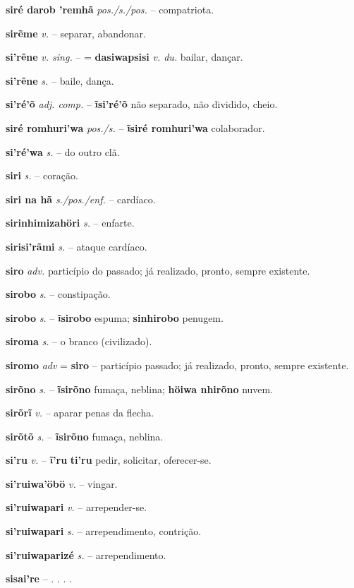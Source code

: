 \textbf{siré darob 'remhã} \textit{pos./s./pos.} -- compatriota.

\textbf{sirẽme} \textit{v.} -- separar, abandonar.

\textbf{si'rẽne} \textit{v. sing.} -- = \textbf{dasiwapsisi} \textit{v. du.} bailar, dançar.

\textbf{si'rẽne} \textit{s.} -- baile, dança.

\textbf{si'ré'õ} \textit{adj. comp.} -- \textbf{ĩsi'ré'õ} não separado, não dividido, cheio.

\textbf{siré romhuri'wa} \textit{pos./s.} -- \textbf{ĩsiré romhuri'wa} colaborador.

\textbf{si'ré'wa} \textit{s.} -- do outro clã.

\textbf{siri} \textit{s.} -- coração.

\textbf{siri na hã} \textit{s./pos./enf.} -- cardíaco.

\textbf{sirinhimizahöri} \textit{s.} -- enfarte.

\textbf{sirisi'rãmi} \textit{s.} -- ataque cardíaco.

\textbf{siro} \textit{adv.} particípio do passado; já realizado, pronto, sempre existente.

\textbf{sirobo} \textit{s.} -- constipação.

\textbf{sirobo} \textit{s.} -- \textbf{ĩsirobo} espuma; \textbf{sinhirobo} penugem.

\textbf{siroma} \textit{s.} -- o branco (civilizado).

\textbf{siromo} \textit{adv} = \textbf{siro} -- particípio passado; já realizado, pronto, sempre existente.

\textbf{sirõno} \textit{s.} -- \textbf{ĩsirõno} fumaça, neblina; \textbf{höiwa nhirõno} nuvem.

\textbf{sirõrĩ} \textit{v.} -- aparar penas da flecha.

\textbf{sirõtõ} \textit{s.} -- \textbf{ĩsirõno} fumaça, neblina.

\textbf{si'ru} \textit{v.} -- \textbf{ĩ'ru} \textbf{ti'ru} pedir, solicitar, oferecer-se.

\textbf{si'ruiwa'öbö} \textit{v.} -- vingar.

\textbf{si'ruiwapari} \textit{v.} -- arrepender-se.

\textbf{si'ruiwapari} \textit{s.} -- arrependimento, contrição.

\textbf{si'ruiwaparizé} \textit{s.} -- arrependimento.

\textbf{sisai're} \textit{} -- . . . .

